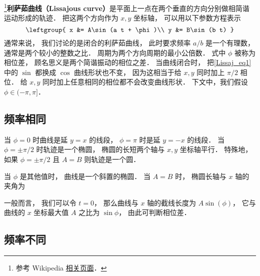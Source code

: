 
\begin{issues}
\issueDraft
\end{issues}


\footnote{参考 Wikipedia \href{https://en.wikipedia.org/wiki/Lissajous_curve}{相关页面}．}\textbf{利萨茹曲线（Lissajous curve）}是平面上一点在两个垂直的方向分别做相简谐运动形成的轨迹． 把这两个方向作为 $x, y$ 坐标轴， 可以用以下参数方程表示
\begin{equation}\label{Lissaj_eq1}
\leftgroup{
x &= A\sin(a t + \phi)\\
y &= B\sin(b t)
}\end{equation}
通常来说， 我们讨论的是闭合的利萨茹曲线， 此时要求频率 $a/b$ 是一个有理数， 通常是两个较小的整数之比． 周期为两个方向周期的最小公倍数． 式中 $\phi$ 被称为相位差， 顾名思义是两个简谐振动的相位之差． 当曲线闭合时， 把\autoref{Lissaj_eq1} 中的 $\sin$ 都换成 $\cos$ 曲线形状也不变， 因为这相当于给 $x, y$ 同时加上 $\pi/2$ 相位． 给 $x, y$ 同时加上任意相同的相位都不会改变曲线形状． 下文中，我们假设 $\phi \in (-\pi, \pi]$．

\subsection{频率相同}
当 $\phi = 0$ 时曲线是延 $y=x$ 的线段， $\phi = \pi$ 时是延 $y=-x$ 的线段． 当 $\phi = \pm\pi/2$ 时轨迹是一个椭圆， 椭圆的长短两个轴与 $x,y$ 坐标轴平行． 特殊地， 如果 $\phi = \pm\pi/2$ 且 $A = B$ 则轨迹是一个圆．

当 $\phi$ 是其他值时， 曲线是一个斜置的椭圆． 当 $A = B$ 时， 椭圆长轴与 $x$ 轴的夹角为

一般而言， 我们可以令 $t = 0$， 那么曲线与 $x$ 轴的截线长度为 $A\sin(\phi)$， 它与曲线的 $x$ 坐标最大值 $A$ 之比为 $\sin\phi$， 由此可判断相位差．

\subsection{频率不同}

